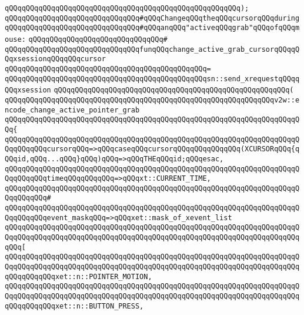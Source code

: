 \verb|qQQqqQQqqQQqqQQqqQQqqQQqqQQqqQQqqQQqqQQqqQQqqQQqqQQqqQQq);|\newline
\newline
\verb|qQQqqQQqqQQqqQQqqQQqqQQqqQQqqQQq#qQQqChangeqQQqtheqQQqcursorqQQqduring|\newline
\verb|qQQqqQQqqQQqqQQqqQQqqQQqqQQqqQQq#qQQqanqQQq"activeqQQqgrab"qQQqofqQQqmouse:|\newline
\verb|qQQqqQQqqQQqqQQqqQQqqQQqqQQqqQQq#|\newline
\verb|qQQqqQQqqQQqqQQqqQQqqQQqqQQqqQQqfunqQQqchange_active_grab_cursorqQQqqQQqxsessionqQQqqQQqcursor|\newline
\verb|qQQqqQQqqQQqqQQqqQQqqQQqqQQqqQQqqQQqqQQqqQQqqQQq=|\newline
\verb|qQQqqQQqqQQqqQQqqQQqqQQqqQQqqQQqqQQqqQQqqQQqqQQqsn::send_xrequestqQQqqQQqxsession|\newline
\verb|qQQqqQQqqQQqqQQqqQQqqQQqqQQqqQQqqQQqqQQqqQQqqQQqqQQqqQQq(|\newline
\verb|qQQqqQQqqQQqqQQqqQQqqQQqqQQqqQQqqQQqqQQqqQQqqQQqqQQqqQQqqQQqqQQqv2w::encode_change_active_pointer_grab|\newline
\verb|qQQqqQQqqQQqqQQqqQQqqQQqqQQqqQQqqQQqqQQqqQQqqQQqqQQqqQQqqQQqqQQqqQQqqQQq{|\newline
\verb|qQQqqQQqqQQqqQQqqQQqqQQqqQQqqQQqqQQqqQQqqQQqqQQqqQQqqQQqqQQqqQQqqQQqqQQqqQQqqQQqcursorqQQq=>qQQqcaseqQQqcursorqQQqqQQqqQQqqQQq(XCURSORqQQq{qQQqid,qQQq...qQQq}qQQq)qQQq=>qQQqTHEqQQqid;qQQqesac,|\newline
\verb|qQQqqQQqqQQqqQQqqQQqqQQqqQQqqQQqqQQqqQQqqQQqqQQqqQQqqQQqqQQqqQQqqQQqqQQqqQQqqQQqtimeqQQqqQQqqQQq=>qQQqxt::CURRENT_TIME,|\newline
\verb|qQQqqQQqqQQqqQQqqQQqqQQqqQQqqQQqqQQqqQQqqQQqqQQqqQQqqQQqqQQqqQQqqQQqqQQqqQQqqQQq#|\newline
\verb|qQQqqQQqqQQqqQQqqQQqqQQqqQQqqQQqqQQqqQQqqQQqqQQqqQQqqQQqqQQqqQQqqQQqqQQqqQQqqQQqevent_maskqQQq=>qQQqxet::mask_of_xevent_list|\newline
\verb|qQQqqQQqqQQqqQQqqQQqqQQqqQQqqQQqqQQqqQQqqQQqqQQqqQQqqQQqqQQqqQQqqQQqqQQqqQQqqQQqqQQqqQQqqQQqqQQqqQQqqQQqqQQqqQQqqQQqqQQqqQQqqQQqqQQqqQQqqQQqqQQq[|\newline
\verb|qQQqqQQqqQQqqQQqqQQqqQQqqQQqqQQqqQQqqQQqqQQqqQQqqQQqqQQqqQQqqQQqqQQqqQQqqQQqqQQqqQQqqQQqqQQqqQQqqQQqqQQqqQQqqQQqqQQqqQQqqQQqqQQqqQQqqQQqqQQqqQQqqQQqqQQqxet::n::POINTER_MOTION,|\newline
\verb|qQQqqQQqqQQqqQQqqQQqqQQqqQQqqQQqqQQqqQQqqQQqqQQqqQQqqQQqqQQqqQQqqQQqqQQqqQQqqQQqqQQqqQQqqQQqqQQqqQQqqQQqqQQqqQQqqQQqqQQqqQQqqQQqqQQqqQQqqQQqqQQqqQQqqQQqxet::n::BUTTON_PRESS,|\newline
